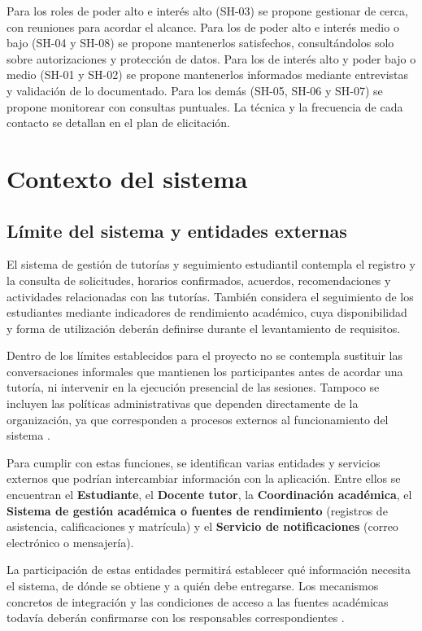 \documentclass[11pt,a4paper]{article}
\begin{document}
Para los roles de poder alto e interés alto (SH-03) se propone gestionar de cerca, con reuniones para acordar el alcance. Para los de poder alto e interés medio o bajo (SH-04 y SH-08) se propone mantenerlos satisfechos, consultándolos solo sobre autorizaciones y protección de datos. Para los de interés alto y poder bajo o medio (SH-01 y SH-02) se propone mantenerlos informados mediante entrevistas y validación de lo documentado. Para los demás (SH-05, SH-06 y SH-07) se propone monitorear con consultas puntuales. La técnica y la frecuencia de cada contacto se detallan en el plan de elicitación.


\section{Contexto del sistema}

\subsection{Límite del sistema y entidades externas}

El sistema de gestión de tutorías y seguimiento estudiantil contempla el registro y la consulta de solicitudes, horarios confirmados, acuerdos, recomendaciones y actividades relacionadas con las tutorías. También considera el seguimiento de los estudiantes mediante indicadores de rendimiento académico, cuya disponibilidad y forma de utilización deberán definirse durante el levantamiento de requisitos.

Dentro de los límites establecidos para el proyecto no se contempla sustituir las conversaciones informales que mantienen los participantes antes de acordar una tutoría, ni intervenir en la ejecución presencial de las sesiones. Tampoco se incluyen las políticas administrativas que dependen directamente de la organización, ya que corresponden a procesos externos al funcionamiento del sistema \cite{pohl2015requirements}.

Para cumplir con estas funciones, se identifican varias entidades y servicios externos que podrían intercambiar información con la aplicación. Entre ellos se encuentran el \textbf{Estudiante}, el \textbf{Docente tutor}, la \textbf{Coordinación académica}, el \textbf{Sistema de gestión académica o fuentes de rendimiento} (registros de asistencia, calificaciones y matrícula) y el \textbf{Servicio de notificaciones} (correo electrónico o mensajería).

La participación de estas entidades permitirá establecer qué información necesita el sistema, de dónde se obtiene y a quién debe entregarse. Los mecanismos concretos de integración y las condiciones de acceso a las fuentes académicas todavía deberán confirmarse con los responsables correspondientes \cite{pohl2015requirements}.
\end{document}
